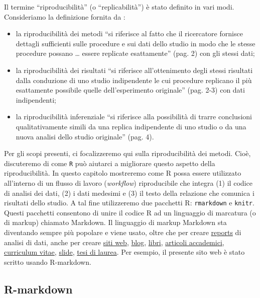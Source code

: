 \documentclass[
]{memoir}
\theoremstyle{definition}
\theoremstyle{definition}
\theoremstyle{definition}
\theoremstyle{definition}
\theoremstyle{remark}
\begin{document}
Il termine ``riproducibilità'' (o ``replicabilità'') è stato definito in vari modi. Consideriamo la definizione fornita da \citet{goodman2016does}:

\begin{itemize}
\item
  la riproducibilità dei metodi ``si riferisce al fatto che il ricercatore fornisce dettagli sufficienti sulle procedure e sui dati dello studio in modo che le stesse procedure possano \ldots{} essere replicate esattamente'' (pag. 2) con gli stessi dati;
\item
  la riproducibilità dei risultati ``si riferisce all'ottenimento degli stessi risultati dalla conduzione di uno studio indipendente le cui procedure replicano il più esattamente possibile quelle dell'esperimento originale'' (pag. 2-3) con dati indipendenti;
\item
  la riproducibilità inferenziale ``si riferisce alla possibilità di trarre conclusioni qualitativamente simili da una replica indipendente di uno studio o da una nuova analisi dello studio originale'' (pag. 4).
\end{itemize}

Per gli scopi presenti, ci focalizzeremo qui sulla riproducibilità dei metodi. Cioè, discuteremo di come \texttt{R} può aiutarci a migliorare questo aspetto della riproducibilità. In questo capitolo mostreremo come R possa essere utilizzato all'interno di un flusso di lavoro (\emph{workflow}) riproducibile che integra (1) il codice di analisi dei dati, (2) i dati medesimi e (3) il testo della relazione che comunica i risultati dello studio. A tal fine utilizzeremo due pacchetti R: \texttt{rmarkdown} e \texttt{knitr}. Questi pacchetti consentono di unire il codice R ad un linguaggio di marcatura (o di markup) chiamato Markdown. Il linguaggio di markup Markdown sta diventando sempre più popolare e viene usato, oltre che per creare \href{https://avehtari.github.io/ROS-Examples/Simplest/simplest.html}{reports} di analisi di dati, anche per creare \href{https://alison.rbind.io}{siti web}, \href{https://djnavarro.net}{blog}, \href{https://r4ds.had.co.nz}{libri}, \href{https://osf.io/9te8p/}{articoli accademici}, \href{https://github.com/mitchelloharawild/vitae}{curriculum vitae}, \href{https://rmarkdown.rstudio.com/lesson-11.html}{slide}, \href{https://github.com/ismayc/thesisdown}{tesi di laurea}. Per esempio, il presente sito web è stato scritto usando R-markdown.

\hypertarget{r-markdown}{%
\subsection{R-markdown}\label{r-markdown}}
\end{document}
